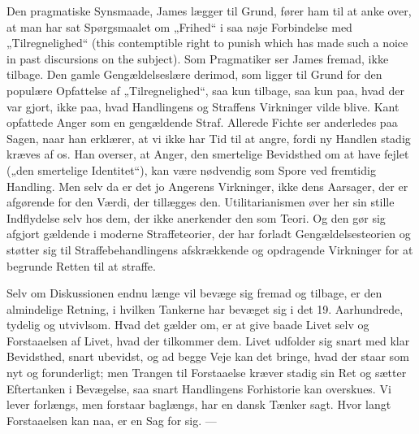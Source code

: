 \documentclass[12pt,a4paper,openany]{book}
\newcommand{\opage}[1]{\marginnote{\footnotesize\textit{[#1]}}}
\begin{document}
Den pragmatiske Synsmaade, James lægger til Grund, fører ham
til at anke over, at man har sat Spørgsmaalet om „Frihed“ i saa nøje
Forbindelse med „Tilregnelighed“ (this contemptible right to punish
which has made such a noice in past discursions on the subject).
Som Pragmatiker ser James fremad, ikke tilbage. Den gamle
Gengældelseslære derimod, som ligger til Grund for den populære
Opfattelse af „Tilregnelighed“, saa kun tilbage, saa kun paa, hvad der
var gjort, ikke paa, hvad Handlingens og Straffens Virkninger vilde
blive. Kant opfattede Anger som en gengældende Straf. Allerede
Fichte ser anderledes paa Sagen, naar han erklærer, at vi ikke har
Tid til at angre, fordi ny Handlen stadig kræves af os. Han overser,
at Anger, den smertelige Bevidsthed om at have fejlet („den smertelige
Identitet“), kan være nødvendig som Spore ved fremtidig Handling.
Men selv da er det jo Angerens Virkninger, ikke dens Aarsager,
der er afgørende for den Værdi, der tillægges den. Utilitarianismen
øver her sin stille Indflydelse selv hos dem, der ikke anerkender
den som Teori. Og den gør sig afgjort gældende i moderne Straffeteorier,
der har forladt Gengældelsesteorien og støtter sig til Straffebehandlingens
afskrækkende og opdragende Virkninger for at begrunde
Retten til at straffe.

Selv om Diskussionen endnu længe vil bevæge sig fremad og tilbage,
er den almindelige Retning, i hvilken Tankerne har bevæget
sig i det 19. Aarhundrede, tydelig og utvivlsom. Hvad det gælder om,
er at give baade Livet selv og Forstaaelsen af Livet, hvad der tilkommer
dem. Livet udfolder sig snart med klar Bevidsthed, snart
\opage{74}ubevidst, og ad begge Veje kan det bringe, hvad der staar som nyt
og forunderligt; men Trangen til Forstaaelse kræver stadig sin Ret
og sætter Eftertanken i Bevægelse, saa snart Handlingens Forhistorie
kan overskues. Vi lever forlængs, men forstaar baglængs, har en
dansk Tænker sagt. Hvor langt Forstaaelsen kan naa, er en Sag
for sig. ---
\end{document}
